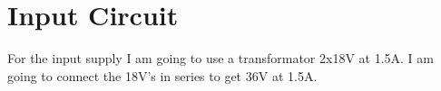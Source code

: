 \section{Input Circuit}
For the input supply I am going to use a transformator 2x18V at 1.5A. I am going to connect the 18V's in series to get 36V at 1.5A.
